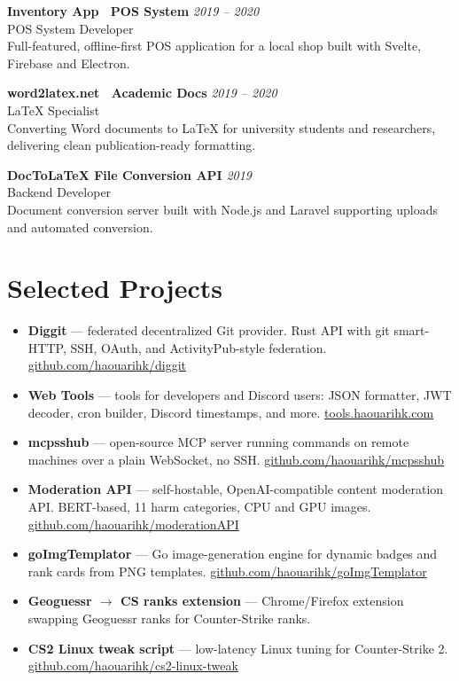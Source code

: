 \documentclass[10pt,a4paper]{article}
\newcommand{\head}[1]{{\section*{#1}}}
\begin{document}
\vspace{6pt}
\noindent\textbf{Inventory App \textperiodcentered\ POS System} \hfill \textit{2019 -- 2020}\\
POS System Developer\\
{\small Full-featured, offline-first POS application for a local shop built with Svelte, Firebase and Electron.}

\vspace{6pt}
\noindent\textbf{word2latex.net \textperiodcentered\ Academic Docs} \hfill \textit{2019 -- 2020}\\
LaTeX Specialist\\
{\small Converting Word documents to LaTeX for university students and researchers, delivering clean publication-ready formatting.}

\vspace{6pt}
\noindent\textbf{DocToLaTeX File Conversion API} \hfill \textit{2019}\\
Backend Developer\\
{\small Document conversion server built with Node.js and Laravel supporting uploads and automated conversion.}

\head{Selected Projects}
\begin{itemize}
  \item \textbf{Diggit} --- federated decentralized Git provider. Rust API with git smart-HTTP, SSH, OAuth, and ActivityPub-style federation. \href{https://github.com/haouarihk/diggit}{github.com/haouarihk/diggit}
  \item \textbf{Web Tools} --- tools for developers and Discord users: JSON formatter, JWT decoder, cron builder, Discord timestamps, and more. \href{https://tools.haouarihk.com}{tools.haouarihk.com}
  \item \textbf{mcpsshub} --- open-source MCP server running commands on remote machines over a plain WebSocket, no SSH. \href{https://github.com/haouarihk/mcpsshub}{github.com/haouarihk/mcpsshub}
  \item \textbf{Moderation API} --- self-hostable, OpenAI-compatible content moderation API. BERT-based, 11 harm categories, CPU and GPU images. \href{https://github.com/haouarihk/moderationAPI}{github.com/haouarihk/moderationAPI}
  \item \textbf{goImgTemplator} --- Go image-generation engine for dynamic badges and rank cards from PNG templates. \href{https://github.com/haouarihk/goImgTemplator}{github.com/haouarihk/goImgTemplator}
  \item \textbf{Geoguessr $\rightarrow$ CS ranks extension} --- Chrome/Firefox extension swapping Geoguessr ranks for Counter-Strike ranks.
  \item \textbf{CS2 Linux tweak script} --- low-latency Linux tuning for Counter-Strike 2. \href{https://github.com/haouarihk/cs2-linux-tweak}{github.com/haouarihk/cs2-linux-tweak}
\end{itemize}
\end{document}
